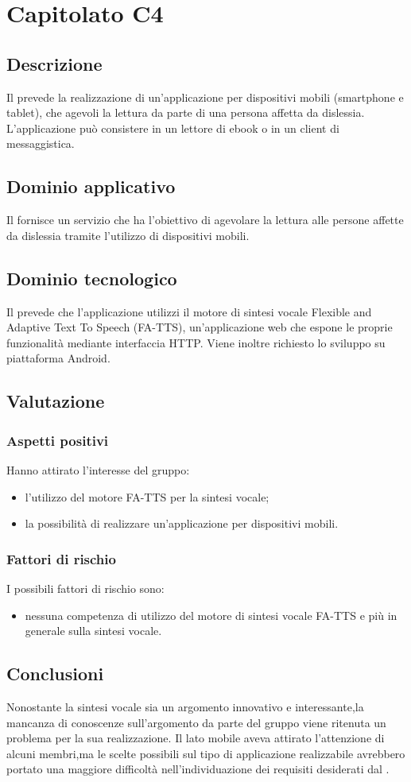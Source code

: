 \section {Capitolato C4}
	\subsection {Descrizione}
	Il  prevede la realizzazione di un'applicazione per dispositivi mobili (smartphone e tablet), che agevoli la
lettura da parte di una persona affetta da dislessia.  L'applicazione può consistere in un lettore di ebook o in un
client di messaggistica.
	\subsection {Dominio applicativo}
	Il  fornisce un servizio che ha l'obiettivo di agevolare la lettura alle persone affette da dislessia tramite l'utilizzo di dispositivi mobili. 
	\subsection {Dominio tecnologico}
Il  prevede che l'applicazione utilizzi il motore di sintesi vocale Flexible and Adaptive Text To Speech (FA-TTS), un'applicazione web che
espone le proprie funzionalità mediante interfaccia HTTP. Viene inoltre richiesto lo sviluppo su piattaforma Android.
	\subsection {Valutazione}
			\subsubsection {Aspetti positivi}
			Hanno attirato l'interesse del gruppo:
				\begin {itemize}
				  \item l'utilizzo del motore FA-TTS per la sintesi vocale;
				  \item la possibilità di realizzare un'applicazione per dispositivi mobili.		
				\end {itemize}
			\subsubsection {Fattori di rischio}
			I possibili fattori di rischio sono:
				\begin {itemize}
					\item nessuna competenza di utilizzo del motore di sintesi vocale FA-TTS e più in generale sulla sintesi vocale.
				\end {itemize}
	\subsection {Conclusioni}
		Nonostante la sintesi vocale sia un argomento innovativo e interessante,la mancanza di conoscenze sull'argomento da parte del gruppo viene ritenuta un problema per la sua realizzazione. Il lato mobile aveva attirato l'attenzione di alcuni membri,ma le scelte possibili sul tipo di applicazione realizzabile avrebbero portato una maggiore difficoltà nell'individuazione dei requisiti desiderati dal .